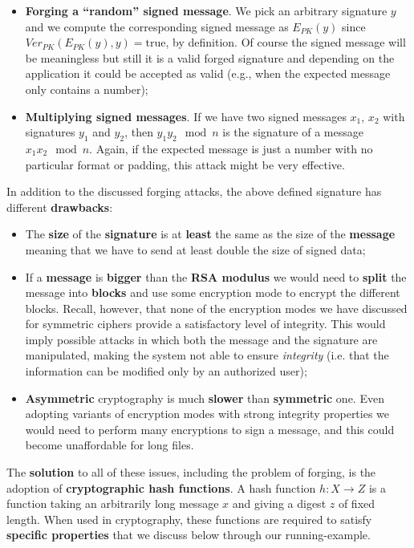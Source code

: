 \begin{itemize}
    \item \textbf{Forging a “random” signed message}. We pick an arbitrary signature $y$ and we compute the corresponding signed message as $E_{PK}(y)$ since $Ver_{PK}(E_{PK}(y),y) = \text{true}$, by definition. Of course the signed message will be meaningless but still it is a valid forged signature and depending on the application it could be accepted as valid (e.g., when the expected message only contains a number);
    \item \textbf{Multiplying signed messages}. If we have two signed messages $x_1$, $x_2$ with signatures $y_1$ and $y_2$, then $y_1 y_2 \mod n$ is the signature of a message $x_1 x_2 \mod n$. Again, if the expected message is just a number with no particular format or padding, this attack might be very effective.
\end{itemize}

In addition to the discussed forging attacks, the above defined signature has different \textbf{drawbacks}:

\begin{itemize}
    \item The \textbf{size} of the \textbf{signature} is at \textbf{least} the same as the size of the \textbf{message} meaning that we have to send at least double the size of signed data;
    \item If a \textbf{message} is \textbf{bigger} than the \textbf{RSA modulus} we would need to \textbf{split} the message into \textbf{blocks} and use some encryption mode to encrypt the different blocks. Recall, however, that none of the encryption modes we have discussed for symmetric ciphers provide a satisfactory level of integrity. This would imply possible attacks in which both the message and the signature are manipulated, making the system not able to ensure \textit{integrity} (i.e. that the information can be modified only by an authorized user);
    \item \textbf{Asymmetric} cryptography is much \textbf{slower} than \textbf{symmetric} one. Even adopting variants of encryption modes with strong integrity properties we would need to perform many encryptions to sign a message, and this could become unaffordable for long files.
\end{itemize}

The \textbf{solution} to all of these issues, including the problem of forging, is the adoption of \textbf{cryptographic hash functions}. A hash function $h: X \rightarrow Z$ is a function taking an arbitrarily long message $x$ and giving a digest $z$ of fixed length. When used in cryptography, these functions are required to satisfy \textbf{specific properties} that we discuss below through our running-example.

